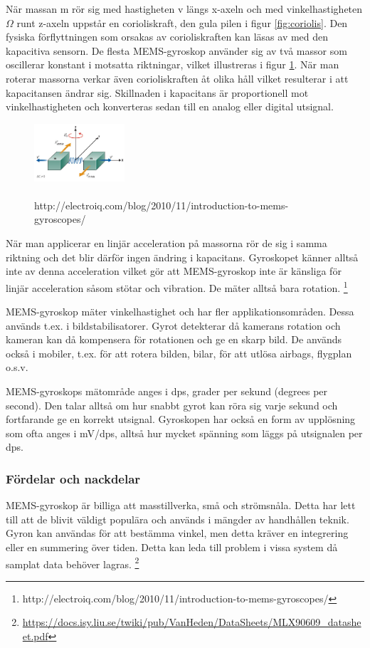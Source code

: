 \documentclass[a4paper,12pt,fleqn]{article}
\begin{document}
När massan m rör sig med hastigheten v längs x-axeln och med vinkelhastigheten $\Omega$ runt z-axeln uppstår en corioliskraft, den gula pilen i figur \ref{fig:coriolis}. Den fysiska förflyttningen som orsakas av corioliskraften kan läsas av med den kapacitiva sensorn. De flesta MEMS-gyroskop använder sig av två massor som oscillerar konstant i motsatta riktningar, vilket illustreras i figur \ref{fig:angular}. När man roterar massorna verkar även corioliskraften åt olika håll vilket resulterar i att kapacitansen ändrar sig. Skillnaden i kapacitans är proportionell mot vinkelhastigheten och konverteras sedan till en analog eller digital utsignal.

\begin{figure}[h]
\begin{center}
\includegraphics[width=0.3\textwidth]
{angularv.png}
\caption{\\http://electroiq.com/blog/2010/11/introduction-to-mems-gyroscopes/}
\label{fig:angular}
\end{center}
\end{figure}


När man applicerar en linjär acceleration på massorna rör de sig i samma riktning och det blir därför ingen ändring i kapacitans. Gyroskopet känner alltså inte av denna acceleration vilket gör att MEMS-gyroskop inte är känsliga för linjär acceleration såsom stötar och vibration. De mäter alltså bara rotation.
\footnote{http://electroiq.com/blog/2010/11/introduction-to-mems-gyroscopes/}


MEMS-gyroskop mäter vinkelhastighet och har fler applikationsområden. Dessa används t.ex. i bildstabilisatorer. Gyrot detekterar då kamerans rotation och kameran kan då kompensera för rotationen och ge en skarp bild. De används också i mobiler, t.ex. för att rotera bilden, bilar, för att utlösa airbags, flygplan o.s.v.

MEMS-gyroskops mätområde anges i dps, grader per sekund (degrees per second). Den talar alltså om hur snabbt gyrot kan röra sig varje sekund och fortfarande ge en korrekt utsignal. Gyroskopen har också en form av upplösning som ofta anges i mV/dps, alltså hur mycket spänning som läggs på utsignalen per dps.

\subsubsection{Fördelar och nackdelar}
MEMS-gyroskop är billiga att masstillverka, små och strömsnåla. Detta har lett till att de blivit väldigt populära och används i mängder av handhållen teknik.
Gyron kan användas för att bestämma vinkel, men detta kräver en integrering eller en summering över tiden. Detta kan leda till problem i vissa system då samplat data behöver lagras.
\footnote{\url{https://docs.isy.liu.se/twiki/pub/VanHeden/DataSheets/MLX90609_datasheet.pdf}}
\end{document}
